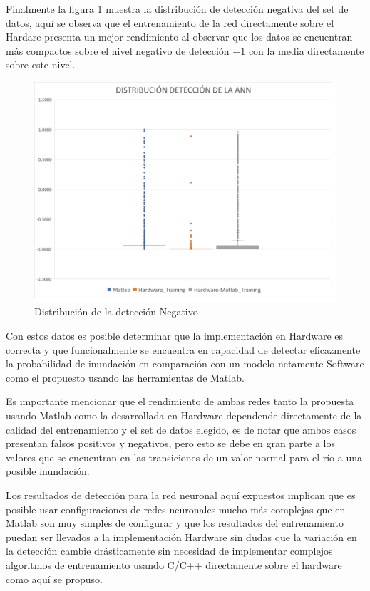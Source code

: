 Finalmente la figura \ref{fig:DistN} muestra la distribución de detección negativa del set de datos, aqui se observa que el entrenamiento de la red directamente sobre el Hardare presenta un mejor rendimiento al observar que los datos se encuentran más compactos sobre el nivel negativo de detección $-1$ con la media directamente sobre este nivel.

\begin{figure}[H]
	\centering
		\includegraphics[scale=0.6]{./Figures/Distribucion2}
	\caption{Distribución de la detección Negativo}
	\label{fig:DistN}
\end{figure}

Con estos datos es posible determinar que la implementación en Hardware es correcta y que funcionalmente se encuentra en capacidad de detectar eficazmente la probabilidad de inundación en comparación con un modelo netamente Software como el propuesto usando las herramientas de Matlab.

Es importante mencionar que el rendimiento de ambas redes tanto la propuesta usando Matlab como la desarrollada en Hardware dependende directamente de la calidad del entrenamiento y el set de datos elegido, es de notar que ambos casos presentan falsos positivos y negativos, pero esto se debe en gran parte a los valores que se encuentran en las transiciones de un valor normal para el río a una posible inundación.

Los resultados de detección para la red neuronal aquí expuestos implican que es posible usar configuraciones de redes neuronales mucho más complejas que en Matlab son muy simples de configurar y que los resultados del entrenamiento puedan ser llevados a la implementación Hardware sin dudas que la variación en la detección cambie drásticamente sin necesidad de implementar complejos algoritmos de entrenamiento usando C/C++ directamente sobre el hardware como aquí se propuso.